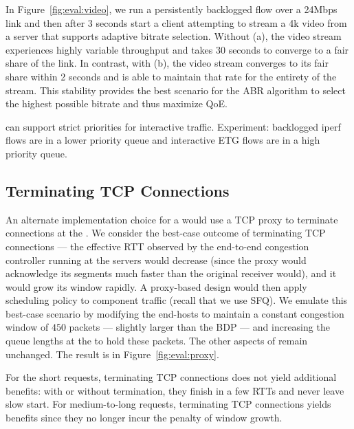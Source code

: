 
\label{s:eval:ratestable}
In Figure~\ref{fig:eval:video}, we run a persistently backlogged flow over a 24Mbps link and then
after 3 seconds start a client attempting to stream a 4k video from a server that supports adaptive
bitrate selection. Without \name (a), the video stream experiences highly variable throughput and 
takes 30 seconds to converge to a fair share of the link. In contrast, with \name (b), the video
stream converges to its fair share within 2 seconds and is able to maintain that rate for the
entirety of the stream. This stability provides the best scenario for the ABR algorithm to select
the highest possible bitrate and thus maximize QoE.


\begin{outline}
    \1 \name can support strict priorities for interactive traffic.
    \1 Experiment: backlogged iperf flows are in a lower priority queue and interactive ETG flows are in a high priority queue.
\end{outline}


\subsection{Terminating TCP Connections}\label{s:eval:proxy}
An alternate implementation choice for a \name would use a TCP proxy to terminate connections at the \inbox. 
We consider the best-case outcome of terminating TCP connections --- the effective RTT observed by the end-to-end congestion controller running at the servers would decrease (since the proxy would acknowledge its segments much faster than the original receiver would), and it would grow its window rapidly.
A proxy-based design would then apply scheduling policy to component traffic (recall that we use SFQ).
We emulate this best-case scenario by modifying the end-hosts to maintain a constant congestion window of $450$ packets --- slightly larger than the BDP --- and increasing the queue lengths at the \inbox to hold these packets. The other aspects of \name remain unchanged.
The result is in Figure~\ref{fig:eval:proxy}.
%

%
For the short requests, terminating TCP connections does not yield additional benefits: with or without termination, they finish in a few RTTs and never leave slow start.
For medium-to-long requests, terminating TCP connections yields benefits since they no longer incur the penalty of window growth.

